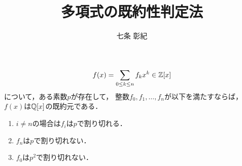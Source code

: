 \documentclass[lualatex, ja=standard, a4paper]{bxjsarticle}
\title{多項式の既約性判定法}
\author{七条 彰紀}
\begin{document}
\maketitle

\begin{Thm}
    \[ f(x)=\sum_{0 \leq k \leq n}{f_k x^k} \in \mathbb{Z}[x] \]
    について，ある素数$p$が存在して，
    整数$f_0, f_1, \dots, f_n$が以下を満たすならば，
    $f(x)$は$\mathbb{Q}[x]$の既約元である．
    \begin{enumerate}
        \item $i \neq n$の場合は$f_i$は$p$で割り切れる．
        \item $f_n$は$p$で割り切れない．
        \item $f_0$は$p^2$で割り切れない．
    \end{enumerate}
\end{Thm}
\end{document}
